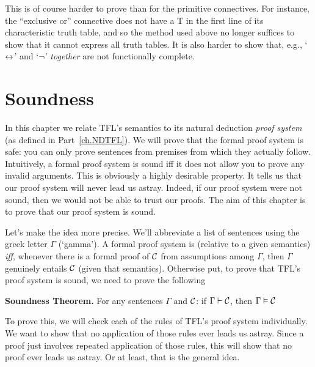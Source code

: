 This is of course harder to prove than for the primitive connectives. For instance, the ``exclusive or'' connective does not have a T in the first line of its characteristic truth table, and so the method used above no longer suffices to show that it cannot express all truth tables.  It is also harder to show that, e.g., `$\leftrightarrow$' and `$\neg$' \emph{together} are not functionally complete.


\chapter{Soundness}\label{ch:Soundness}

In this chapter we relate TFL's semantics to its natural deduction \emph{proof system} (as defined in Part~\ref{ch.NDTFL}). We will prove that the formal proof system is safe: you can only prove sentences from premises from which they actually follow.
Intuitively, a formal proof system is sound iff it does not allow you to prove any invalid arguments. This is obviously a highly desirable property. It tells us that our proof system will never lead us astray. Indeed, if our proof system were not sound, then we would not be able to trust our proofs. The aim of this chapter is to prove that our proof system is sound.

Let's make the idea more precise. We'll abbreviate a list of sentences using the greek letter $\Gamma$ (`gamma'). A formal proof system is  (relative to a given semantics) \emph{iff}, whenever there is a formal proof of $\mathcal{C}$ from assumptions among $\Gamma$, then $\Gamma$ genuinely entails $\mathcal{C}$ (given that semantics). Otherwise put, to prove that TFL's proof system is sound, we need to prove the following

\begin{factoidboxe}\textbf{Soundness Theorem.} For any sentences $\Gamma$ and $\mathcal{C}$: if $\Gamma\vdash\mathcal{C}$, then $\Gamma \vDash\mathcal{C}$
\end{factoidboxe}

To prove this, we will check each of the rules of TFL's proof system individually. We want to show that no application of those rules ever leads us astray. Since a proof just involves repeated application of those rules, this will show that no proof ever leads us astray. Or at least, that is the general idea.

